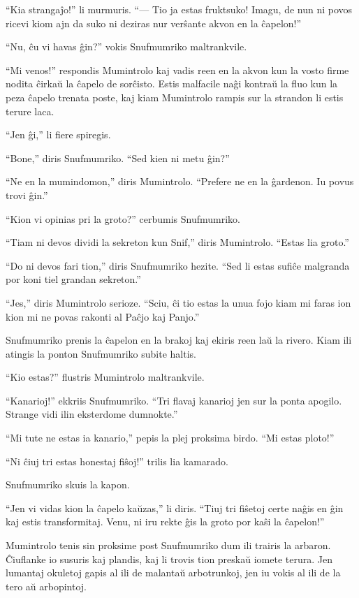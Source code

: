 ``Kia strangaĵo!'' li murmuris. ``--- Tio ja estas fruktsuko! Imagu, de nun ni povos ricevi kiom ajn da suko ni deziras nur verŝante akvon en la ĉapelon!''

``Nu, ĉu vi havas ĝin?'' vokis Snufmumriko maltrankvile.

``Mi venos!'' respondis Mumintrolo kaj vadis reen en la akvon kun la vosto firme nodita ĉirkaŭ la ĉapelo de sorĉisto. Estis malfacile naĝi kontraŭ la fluo kun la peza ĉapelo trenata poste, kaj kiam Mumintrolo rampis sur la strandon li estis terure laca.

``Jen ĝi,'' li fiere spiregis.

``Bone,'' diris Snufmumriko. ``Sed kien ni metu ĝin?''

``Ne en la mumindomon,'' diris Mumintrolo. ``Prefere ne en la ĝardenon. Iu povus trovi ĝin.''

``Kion vi opinias pri la groto?'' cerbumis Snufmumriko.

``Tiam ni devos dividi la sekreton kun Snif,'' diris Mumintrolo. ``Estas lia groto.''

``Do ni devos fari tion,'' diris Snufmumriko hezite. ``Sed li estas sufiĉe malgranda por koni tiel grandan sekreton.''

``Jes,'' diris Mumintrolo serioze. ``Sciu, ĉi tio estas la unua fojo kiam mi faras ion kion mi ne povas rakonti al Paĉjo kaj Panjo.''

Snufmumriko prenis la ĉapelon en la brakoj kaj ekiris reen laŭ la rivero. Kiam ili atingis la ponton Snufmumriko subite haltis.

``Kio estas?'' flustris Mumintrolo maltrankvile.

``Kanarioj!'' ekkriis Snufmumriko. ``Tri flavaj kanarioj jen sur la ponta apogilo. Strange vidi ilin eksterdome dumnokte.''

``Mi tute ne estas ia kanario,'' pepis la plej proksima birdo. ``Mi estas ploto!''

``Ni ĉiuj tri estas honestaj fiŝoj!'' trilis lia kamarado.

Snufmumriko skuis la kapon.

``Jen vi vidas kion la ĉapelo kaŭzas,'' li diris. ``Tiuj tri fiŝetoj certe naĝis en ĝin kaj estis transformitaj. Venu, ni iru rekte ĝis la groto por kaŝi la ĉapelon!''

Mumintrolo tenis sin proksime post Snufmumriko dum ili trairis la arbaron. Ĉiuflanke io susuris kaj plandis, kaj li trovis tion preskaŭ iomete terura. Jen lumantaj okuletoj gapis al ili de malantaŭ arbotrunkoj, jen iu vokis al ili de la tero aŭ arbopintoj.

